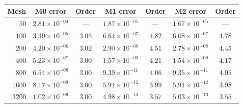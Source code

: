 \begin{tabular}{|r||c|c||c|c||c|c|}
\hline
\bf{Mesh} & \bf{M0 error} & \bf{Order} & \bf{M1 error} & \bf{Order} & \bf{M2 error} & \bf{Order}\\
\hline
\hline
$  50$ & $2.81\times 10^{-04}$ & --- & $1.87\times 10^{-05}$ & --- & $1.67\times 10^{-05}$ & ---\\
\hline
$ 100$ & $3.39\times 10^{-05}$ & $3.05$ & $6.64\times 10^{-07}$ & $4.82$ & $6.08\times 10^{-07}$ & $4.78$\\
\hline
$ 200$ & $4.20\times 10^{-06}$ & $3.02$ & $2.90\times 10^{-08}$ & $4.51$ & $2.78\times 10^{-08}$ & $4.45$\\
\hline
$ 400$ & $5.23\times 10^{-07}$ & $3.00$ & $1.57\times 10^{-09}$ & $4.21$ & $1.54\times 10^{-09}$ & $4.17$\\
\hline
$ 800$ & $6.54\times 10^{-08}$ & $3.00$ & $9.39\times 10^{-11}$ & $4.06$ & $9.35\times 10^{-11}$ & $4.05$\\
\hline
$1600$ & $8.17\times 10^{-09}$ & $3.00$ & $5.91\times 10^{-12}$ & $3.99$ & $5.91\times 10^{-12}$ & $3.98$\\
\hline
$3200$ & $1.02\times 10^{-09}$ & $3.00$ & $4.98\times 10^{-13}$ & $3.57$ & $5.03\times 10^{-13}$ & $3.55$\\
\hline
\end{tabular}
